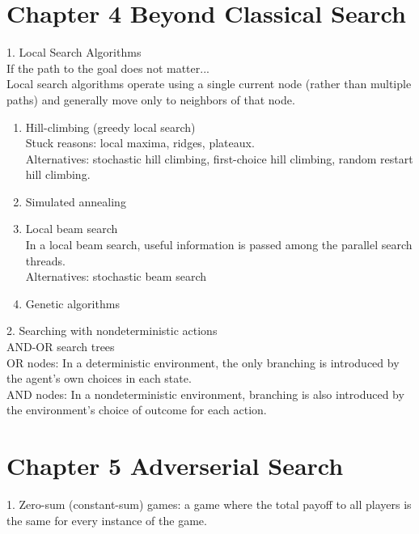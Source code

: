 \documentclass[12pt]{article}
\begin{document}
\section{Chapter 4 Beyond Classical Search}

1. Local Search Algorithms \\

If the path to the goal does not matter... \\

Local search algorithms operate using a single current node (rather than multiple paths) and generally move only to neighbors of that node.

\begin{enumerate} 
  \item Hill-climbing (greedy local search) \\
    Stuck reasons: local maxima, ridges, plateaux. \\
    Alternatives: stochastic hill climbing, first-choice hill climbing, random restart hill climbing.
  \item Simulated annealing
  \item Local beam search \\
    In a local beam search, useful information is passed among the parallel search threads. \\
    Alternatives: stochastic beam search
  \item Genetic algorithms
\end{enumerate}

2. Searching with nondeterministic actions \\

AND-OR search trees \\

OR nodes: In a deterministic environment, the only branching is introduced by the agent's own choices in each state. \\
AND nodes: In a nondeterministic environment, branching is also introduced by the environment's choice of outcome for each action. \\

\section{Chapter 5 Adverserial Search}

1. Zero-sum (constant-sum) games: a game where the total payoff to all players is the same for every instance of the game. \\
\end{document}

